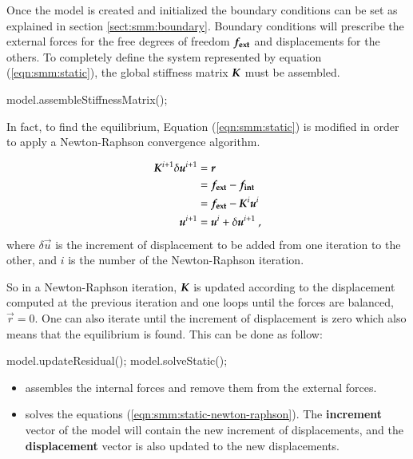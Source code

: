 Once the model is created and  initialized the boundary conditions can be set as
explained   in  section   \ref{sect:smm:boundary}.   Boundary   conditions  will
prescribe   the   external   forces    for   the   free   degrees   of   freedom
$\boldsymbol{f_{{\mathrm{ext}}}}$ and displacements for the others.  To completely define the
system  represented  by equation  (\ref{eqn:smm:static}),  the global  stiffness
matrix            $\boldsymbol{K}$             must            be            assembled.

\begin{cpp}
  model.assembleStiffnessMatrix();
\end{cpp}

In fact, to find the  equilibrium, Equation (\ref{eqn:smm:static}) is modified in
order to apply a Newton-Raphson convergence algorithm.

\begin{align}\label{eqn:smm:static-newton-raphson}
  \boldsymbol{K}^{i+1} \delta\boldsymbol{u}^{i+1} &= \boldsymbol{r} \\
  &= \boldsymbol{f_{{\mathrm{ext}}}} - \boldsymbol{f_{{\mathrm{int}}}}\\
  &= \boldsymbol{f_{{\mathrm{ext}}}} - \boldsymbol{K}^{i} \boldsymbol{u}^{i}\\
  \boldsymbol{u}^{i+1} &= \boldsymbol{u}^{i} + \delta\boldsymbol{u}^{i+1}~,\nonumber
\end{align}
where $\delta\vec{ u}$ is the  increment of displacement  to be added  from one
iteration to the other, and $i$ is the number of the Newton-Raphson iteration.

So  in  a  Newton-Raphson  iteration,  $\boldsymbol{K}$ is  updated  according  to  the
displacement computed at  the previous iteration and one  loops until the forces
are balanced, \ie $\vec{r} = 0$.  One can also iterate until the increment of
displacement is zero which also means that the equilibrium is found. This can be
done as follow:

\begin{cpp}
  model.updateResidual();
  model.solveStatic();
\end{cpp}
\begin{itemize}
\item {} assembles the  internal forces and remove them
  from the external forces.
\item        {}         solves        the        equations
  (\ref{eqn:smm:static-newton-raphson}).   The \textbf{increment} vector  of the
  model   will   contain  the   new   increment   of   displacements,  and   the
  \textbf{displacement} vector is also updated to the new displacements.
\end{itemize}

